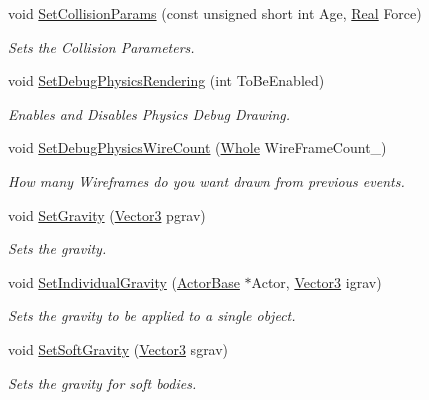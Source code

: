 \begin{DoxyCompactItemize}
void \hyperlink{classphys_1_1PhysicsManager_a98ee9704eec230ff759850ffa8394489}{SetCollisionParams} (const unsigned short int Age, \hyperlink{namespacephys_af7eb897198d265b8e868f45240230d5f}{Real} Force)
\begin{DoxyCompactList}\small\item\em Sets the Collision Parameters. \item\end{DoxyCompactList}\item 
void \hyperlink{classphys_1_1PhysicsManager_a67fb59148a94ced0a92b288a638f89db}{SetDebugPhysicsRendering} (int ToBeEnabled)
\begin{DoxyCompactList}\small\item\em Enables and Disables Physics Debug Drawing. \item\end{DoxyCompactList}\item 
void \hyperlink{classphys_1_1PhysicsManager_ab43a963cf26ca4293a7c34a2a68c4f2c}{SetDebugPhysicsWireCount} (\hyperlink{namespacephys_a460f6bc24c8dd347b05e0366ae34f34a}{Whole} WireFrameCount\_\-)
\begin{DoxyCompactList}\small\item\em How many Wireframes do you want drawn from previous events. \item\end{DoxyCompactList}\item 
void \hyperlink{classphys_1_1PhysicsManager_a3e74f3e0288706d44dc90657a8fa1118}{SetGravity} (\hyperlink{classphys_1_1Vector3}{Vector3} pgrav)
\begin{DoxyCompactList}\small\item\em Sets the gravity. \item\end{DoxyCompactList}\item 
void \hyperlink{classphys_1_1PhysicsManager_af6acab3a35e52b1e25f1ab47f494d90d}{SetIndividualGravity} (\hyperlink{classphys_1_1ActorBase}{ActorBase} $\ast$Actor, \hyperlink{classphys_1_1Vector3}{Vector3} igrav)
\begin{DoxyCompactList}\small\item\em Sets the gravity to be applied to a single object. \item\end{DoxyCompactList}\item 
void \hyperlink{classphys_1_1PhysicsManager_acd1fe36f7cd593da0c466002304065eb}{SetSoftGravity} (\hyperlink{classphys_1_1Vector3}{Vector3} sgrav)
\begin{DoxyCompactList}\small\item\em Sets the gravity for soft bodies. \item\end{DoxyCompactList}\item 

\end{DoxyCompactItemize}
